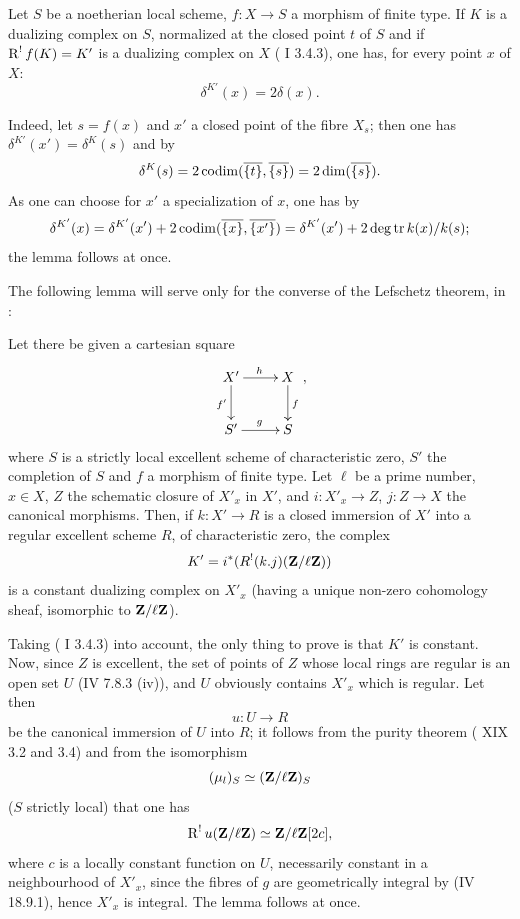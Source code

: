 \begin{sublemma} \label{XIV.2.3.2} Let $S$ be a noetherian local scheme, $f:X\to S$ a morphism of finite type. If $K$ is a dualizing complex on $S$, normalized at the closed point $t$ of $S$ and if $\operatorname{R}^!f(K)=K'$ is a dualizing complex on $X$ (\cf {} I 3.4.3), one has, for every point $x$ of $X$:$$
\delta^{{K'}}(x)=2\delta(x).
$$
\end{sublemma}

Indeed, let $s=f(x)$ and $x'$ a closed point of the fibre $X_s$; then one has $\delta^{K'}(x')=\delta^K(s)$ and by 
$$
\delta^K(s)=2\operatorname{codim}(\overline{\{t\}}, \overline{\{s\}})=2\dim(\overline{\{s\}}).
$$
As one can choose for $x'$ a specialization of $x$, one has by 
$$
\delta^{K'}(x)=\delta^{K'}(x')+2\operatorname{codim}(\overline{\{x\}}, \overline{\{x'\}})=\delta^{K'}(x')+2\operatorname{deg\,tr} k(x)/k(s);$$
the lemma follows at once.

The following lemma will serve only for the converse of the Lefschetz theorem, in \numero{}:

\begin{sublemma} \label{XIV.2.3.3}
Let there be given a cartesian square
$$
\xymatrix{X'\ar[r]^{h}\ar[d]_{f'}&X\ar[d]^f\\S'\ar[r]^g&S},
$$
where $S$ is a strictly local excellent scheme of characteristic zero, $S'$ the completion of $S$ and $f$ a morphism of finite type. Let $\ell$ be a prime number, $x\in X$, $Z$ the schematic closure of $X'_x$ in $X'$, and $i:X'_x\to Z$, $j:Z\to X$ the canonical morphisms. Then, if $k:X'\to R$ is a closed immersion of $X'$ into a regular excellent scheme $R$, of characteristic zero, the complex
$$K'=i^*(R^!(k.j)(\mathbf{Z}/\ell\mathbf{Z}))$$
is a constant dualizing complex on $X'_x$ (\ie having a unique non-zero cohomology sheaf, isomorphic to $\mathbf{Z}/\ell\mathbf{Z}$).
\end{sublemma}

Taking ( I 3.4.3) into account, the only thing to prove is that $K'$ is constant. Now, since $Z$ is excellent, the set of points of $Z$ whose local rings are regular is an open set $U$ (\EGA IV 7.8.3 \textup{(iv)}), and $U$ obviously contains $X'_x$ which is regular. Let then
$$u:U\to R$$
be the canonical immersion of $U$ into $R$; it follows from the purity theorem ( XIX 3.2 and 3.4) and from the isomorphism
$$(\mu_l)_S\simeq(\mathbf{Z}/\ell\mathbf{Z})_S$$
($S$ strictly local) that one has
$$
\operatorname{R}^!u(\mathbf{Z}/\ell\mathbf{Z})\simeq\mathbf{Z}/\ell\mathbf{Z}[2c],
$$
where $c$ is a locally constant function on $U$, necessarily constant in a neighbourhood of $X'_x$, since the fibres of $g$ are geometrically integral by (\EGA IV 18.9.1), hence $X'_x$ is integral. The lemma follows at once.
